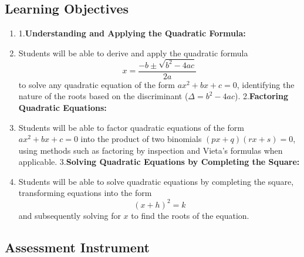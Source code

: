 \subsection{Learning Objectives}

\begin{enumerate}
    \item 1.\textbf{Understanding and Applying the Quadratic Formula:}
    \item Students will be able to derive and apply the quadratic formula $$ x = \frac{-b \pm \sqrt{b^2 - 4ac}}{2a} $$ to solve any quadratic equation of the form $ax^2 + bx + c = 0$, identifying the nature of the roots based on the discriminant ($\Delta = b^2 - 4ac$). 2.\textbf{Factoring Quadratic Equations:}
    \item Students will be able to factor quadratic equations of the form $ax^2 + bx + c = 0$ into the product of two binomials $(px + q)(rx + s) = 0$, using methods such as factoring by inspection and Vieta's formulas when applicable. 3.\textbf{Solving Quadratic Equations by Completing the Square:}
    \item Students will be able to solve quadratic equations by completing the square, transforming equations into the form $$ (x + h)^2 = k $$ and subsequently solving for $x$ to find the roots of the equation.
\end{enumerate}

\subsection{Assessment Instrument}

